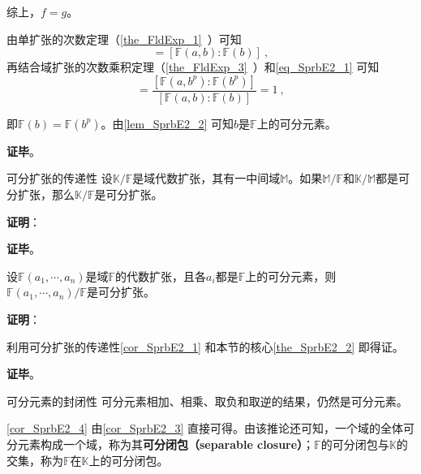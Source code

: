 综上，$f=g$。

由单扩张的次数定理（\autoref{the_FldExp_1}~）可知
\begin{equation}
[\mathbb{F}(a, b^p):\mathbb{F}(b^p)] = [\mathbb{F}(a, b):\mathbb{F}(b)]~,
\end{equation}
再结合域扩张的次数乘积定理（\autoref{the_FldExp_3}~）和\autoref{eq_SprbE2_1} 可知
\begin{equation}
[\mathbb{F}(b):\mathbb{F}(b^p)] = \frac{[\mathbb{F}(a, b^p):\mathbb{F}(b^p)]}{[\mathbb{F}(a, b):\mathbb{F}(b)]} = 1~,
\end{equation}

即$\mathbb{F}(b)=\mathbb{F}(b^p)$。由\autoref{lem_SprbE2_2} 可知$b$是$\mathbb{F}$上的可分元素。

\textbf{证毕}。











\begin{corollary}{可分扩张的传递性}\label{cor_SprbE2_1}
设$\mathbb{K}/\mathbb{F}$是域代数扩张，其有一中间域$\mathbb{M}$。如果$\mathbb{M}/\mathbb{F}$和$\mathbb{K}/\mathbb{M}$都是可分扩张，那么$\mathbb{K}/\mathbb{F}$是可分扩张。
\end{corollary}

\textbf{证明}：



\textbf{证毕}。





\begin{corollary}{}\label{cor_SprbE2_3}
设$\mathbb{F}(a_1, \cdots, a_n)$是域$\mathbb{F}$的代数扩张，且各$a_i$都是$\mathbb{F}$上的可分元素，则$\mathbb{F}(a_1, \cdots, a_n)/\mathbb{F}$是可分扩张。
\end{corollary}

\textbf{证明}：

利用可分扩张的传递性\autoref{cor_SprbE2_1} 和本节的核心\autoref{the_SprbE2_2} 即得证。

\textbf{证毕}。





\begin{corollary}{可分元素的封闭性}\label{cor_SprbE2_4}
可分元素相加、相乘、取负和取逆的结果，仍然是可分元素。
\end{corollary}

\autoref{cor_SprbE2_4} 由\autoref{cor_SprbE2_3} 直接可得。由该推论还可知，一个域的全体可分元素构成一个域，称为其\textbf{可分闭包（separable closure）}；$\mathbb{F}$的可分闭包与$\mathbb{K}$的交集，称为$\mathbb{F}$在$\mathbb{K}$上的可分闭包。











